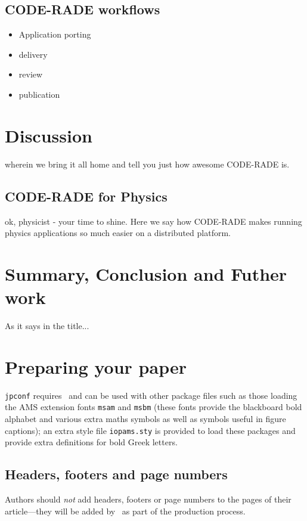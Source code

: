 \documentclass[a4paper]{jpconf}
\begin{document}
\subsection{CODE-RADE workflows}

\begin{itemize}
	\item Application porting
   \item delivery
   \item review
   \item publication
\end{itemize}

\section{Discussion}

wherein we bring it all home and tell you just how awesome CODE-RADE is.

\subsection{CODE-RADE for Physics}

ok, physicist - your time to shine. Here we say how CODE-RADE makes running physics applications so much easier on a distributed platform.

\section{Summary, Conclusion and Futher work}

As it says in the title...

\section{Preparing your paper}
\verb"jpconf" requires \LaTeXe\ and  can be used with other package files such
as those loading the AMS extension fonts
\verb"msam" and \verb"msbm" (these fonts provide the
blackboard bold alphabet and various extra maths symbols as well as
symbols useful in figure captions); an extra style file \verb"iopams.sty" is
provided to load these packages and provide extra definitions for bold Greek letters.
\subsection{Headers, footers and page numbers}
Authors should {\it not} add headers, footers or page numbers to the pages of their article---they will
be added by \iopp\ as part of the production process.
\end{document}

